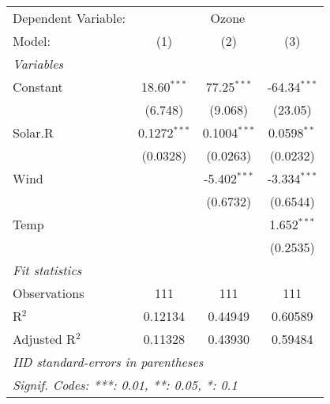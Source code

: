 
\begingroup
\centering
\begin{tabular}{lccc}
   \tabularnewline \midrule \midrule
   Dependent Variable: & \multicolumn{3}{c}{Ozone}\\
   Model:         & (1)            & (2)            & (3)\\  
   \midrule
   \emph{Variables}\\
   Constant       & 18.60$^{***}$  & 77.25$^{***}$  & -64.34$^{***}$\\   
                  & (6.748)        & (9.068)        & (23.05)\\   
   Solar.R        & 0.1272$^{***}$ & 0.1004$^{***}$ & 0.0598$^{**}$\\   
                  & (0.0328)       & (0.0263)       & (0.0232)\\   
   Wind           &                & -5.402$^{***}$ & -3.334$^{***}$\\   
                  &                & (0.6732)       & (0.6544)\\   
   Temp           &                &                & 1.652$^{***}$\\   
                  &                &                & (0.2535)\\   
   \midrule
   \emph{Fit statistics}\\
   Observations   & 111            & 111            & 111\\  
   R$^2$          & 0.12134        & 0.44949        & 0.60589\\  
   Adjusted R$^2$ & 0.11328        & 0.43930        & 0.59484\\  
   \midrule \midrule
   \multicolumn{4}{l}{\emph{IID standard-errors in parentheses}}\\
   \multicolumn{4}{l}{\emph{Signif. Codes: ***: 0.01, **: 0.05, *: 0.1}}\\
\end{tabular}
\par\endgroup


